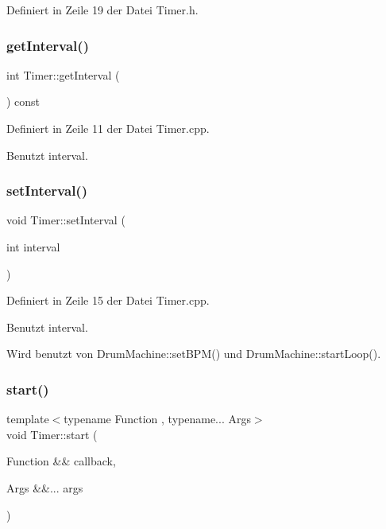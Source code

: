 Definiert in Zeile 19 der Datei Timer.\+h.

\mbox{\label{class_timer_a998fabc8cce38394c4b4536fc81db438}} 
\subsubsection{\texorpdfstring{get\+Interval()}{getInterval()}}
{\footnotesize\ttfamily int Timer\+::get\+Interval (\begin{DoxyParamCaption}{ }\end{DoxyParamCaption}) const}



Definiert in Zeile 11 der Datei Timer.\+cpp.



Benutzt interval.

\mbox{\label{class_timer_aa88ef228247b40496f8474253bda3a0e}} 
\subsubsection{\texorpdfstring{set\+Interval()}{setInterval()}}
{\footnotesize\ttfamily void Timer\+::set\+Interval (\begin{DoxyParamCaption}\item[{int}]{interval }\end{DoxyParamCaption})}



Definiert in Zeile 15 der Datei Timer.\+cpp.



Benutzt interval.



Wird benutzt von Drum\+Machine\+::set\+B\+P\+M() und Drum\+Machine\+::start\+Loop().

\mbox{\label{class_timer_adcf70b5065e31461e27309c96065437a}} 
\subsubsection{\texorpdfstring{start()}{start()}}
{\footnotesize\ttfamily template$<$typename Function , typename... Args$>$ \\
void Timer\+::start (\begin{DoxyParamCaption}\item[{Function \&\&}]{callback,  }\item[{Args \&\&...}]{args }\end{DoxyParamCaption})\hspace{0.3cm}{\ttfamily [inline]}}



